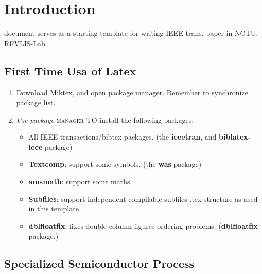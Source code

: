 \documentclass[rfvlsi_template_jrnl.tex]{subfiles}
\begin{document}
\section{Introduction}
% 
% 
% 
% 


 document serves as a starting template for writing IEEE-trans. paper in NCTU, RFVLIS-Lab.

\subsection{First Time Usa of Latex}

\begin{enumerate}
  \item Download Miktex, and open package manager. Remember to synchronize package list. 
  \item \textit{Use} \emph{package} \textsc{manager} \uppercase{to} install the following packages:
	\begin{itemize}
		\item All IEEE transactions/bibtex packages. (the \textbf{ieeetran}, and \textbf{biblatex-ieee} package)
		\item \textbf{Textcomp}: support some symbols. (the \textbf{was} package)
		\item \textbf{amsmath}: support some maths. 
		\item \textbf{Subfiles}: support independent compilable subfiles .tex structure as used in this template. 
		\item \textbf{dblfloatfix}: fixes double column figures ordering problems. (\textbf{dblfloatfix} package.)
	\end{itemize}
\end{enumerate}

\subsection{Specialized Semiconductor Process}
\end{document}
